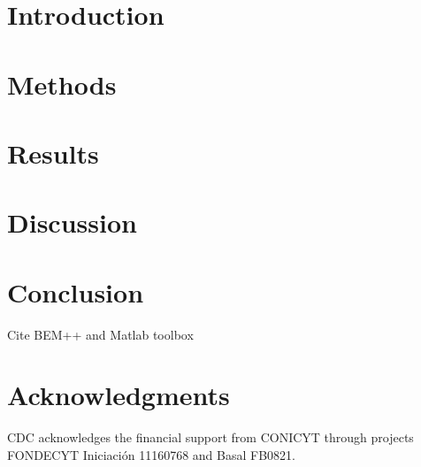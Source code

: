 \documentclass[final,5p,times,twocolumn]{elsarticle}
\begin{document}

\section{Introduction}\label{sec:intro}


\section{Methods}\label{sec:methods}
 

\section{Results} \label{sec:results}


\section{Discussion} \label{sec:discussion}


\section{Conclusion}
%

Cite BEM++ \cite{SmigajETal2015} and Matlab toolbox \cite{HohenesterTrugler2012}



\section*{Acknowledgments}

CDC acknowledges the financial support from CONICYT through projects FONDECYT Iniciaci\'on 11160768 and Basal FB0821.


\end{document}
